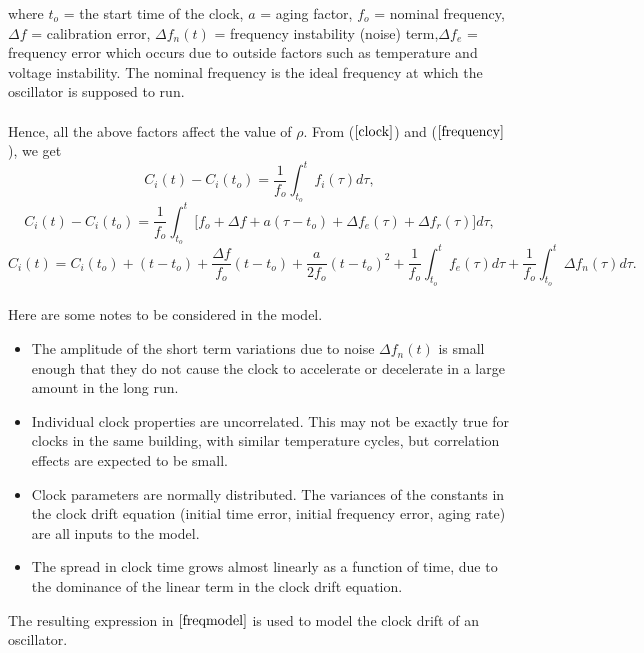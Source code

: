\documentclass[a4paper,10pt]{report}
\begin{document}
where \newline $t_o$ = the start time of the clock, \newline $a$ = aging factor, \newline $f_o$ = nominal frequency, \newline $\Delta
f$ = calibration error, \newline $\Delta f_n(t)$ = frequency instability (noise) term,\newline $\Delta f_e$ = frequency error which occurs
due to outside factors such as temperature and voltage instability.\newline
The nominal frequency is the ideal frequency at which the oscillator is supposed to run. \paragraph*{} Hence, all the above factors affect the value of $\rho$. From ($\ref{clock}$) and ($\ref{frequency}$), we get
\begin{equation}
C_i(t) - C_i(t_o) = \frac{1}{f_o} \int^{t}_{t_o}f_i(\tau)d\tau ,
\end{equation}
\begin{equation}
C_i(t) - C_i(t_o) = \frac{1}{f_o} \int^{t}_{t_o}{[f_o + \Delta f + a(\tau-t_o)  } + \Delta f_e(\tau) + \Delta f_r(\tau)]d\tau ,
\label{fasika}
\end{equation}
\begin{equation}
C_i(t) =  C_i(t_o) + (t-t_o) +\frac{\Delta f}{f_o}(t-t_o) + \frac{a}{2f_o}(t-t_o)^2 + \frac{1}{f_o}\int^{t}_{t_o}{f_e(\tau)d\tau} +
\frac{1}{f_o}\int^{t}_{t_o}{\Delta f_n(\tau)d\tau} .
\label{freqmodel}
\end{equation}
\paragraph*{}
Here are some notes to be considered in the model.
\begin{itemize}
\item The amplitude of the short term variations due to noise $\Delta f_n(t)$ is small enough that they do not cause the clock to accelerate or decelerate in a large amount in the long run.
\item Individual clock properties are uncorrelated. This may not be exactly true for clocks in the same building, with similar temperature cycles, but correlation effects are expected to be small.
\item Clock parameters are normally distributed. The variances of the constants in the clock drift equation (initial time error,
initial frequency error, aging rate) are all inputs to the model.
\item The spread in clock time grows almost linearly as a function of time, due to the dominance of the linear term in the clock drift equation.
\end{itemize}
The resulting expression in $\ref{freqmodel}$ is used to model the clock drift of an oscillator.
\end{document}
